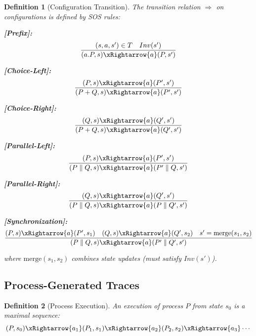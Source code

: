 \documentclass[conference]{IEEEtran}
\newtheorem{definition}{Definition}
\begin{document}
\begin{definition}[Configuration Transition]
The transition relation $\Rightarrow$ on configurations is defined by SOS rules:

\textbf{[Prefix]:}
\begin{equation}
\frac{(s, a, s') \in T \quad Inv(s')}{(a.P, s) \xRightarrow{a} (P, s')}
\end{equation}

\textbf{[Choice-Left]:}
\begin{equation}
\frac{(P, s) \xRightarrow{a} (P', s')}{(P + Q, s) \xRightarrow{a} (P', s')}
\end{equation}

\textbf{[Choice-Right]:}
\begin{equation}
\frac{(Q, s) \xRightarrow{a} (Q', s')}{(P + Q, s) \xRightarrow{a} (Q', s')}
\end{equation}

\textbf{[Parallel-Left]:}
\begin{equation}
\frac{(P, s) \xRightarrow{a} (P', s')}{(P \parallel Q, s) \xRightarrow{a} (P' \parallel Q, s')}
\end{equation}

\textbf{[Parallel-Right]:}
\begin{equation}
\frac{(Q, s) \xRightarrow{a} (Q', s')}{(P \parallel Q, s) \xRightarrow{a} (P \parallel Q', s')}
\end{equation}

\textbf{[Synchronization]:}
\begin{equation}
\frac{(P, s) \xRightarrow{a} (P', s_1) \quad (Q, s) \xRightarrow{a} (Q', s_2) \quad s' = \text{merge}(s_1, s_2)}{(P \parallel Q, s) \xRightarrow{a} (P' \parallel Q', s')}
\end{equation}

where $\text{merge}(s_1, s_2)$ combines state updates (must satisfy $Inv(s')$).
\end{definition}

\subsection{Process-Generated Traces}

\begin{definition}[Process Execution]
An \textit{execution} of process $P$ from state $s_0$ is a maximal sequence:
\begin{equation}
(P, s_0) \xRightarrow{a_1} (P_1, s_1) \xRightarrow{a_2} (P_2, s_2) \xRightarrow{a_3} \cdots
\end{equation}
\end{definition}
\end{document}
